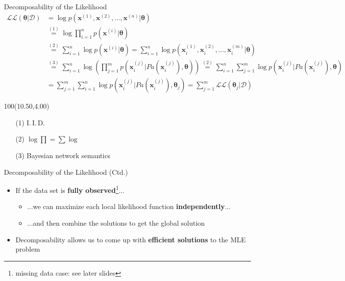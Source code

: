 \begin{frame}{Decomposability of the Likelihood}{}
	\vspace*{-3mm}
	\footnotesize
	\begin{align*}
		\mathcal{L}\mathcal{L}(\bm{\theta} \vert \mathcal{D})
			&= \log p(\bm{x}^{(1)}, \bm{x}^{(2)}, \dots, \bm{x}^{(n)} \vert \bm{\theta}) \\
			&\overset{(1)}{=} \log \prod_{i=1}^n p(\bm{x}^{(i)} \vert \bm{\theta}) \\
			&\overset{(2)}{=} \sum_{i=1}^n \log p(\bm{x}^{(i)} \vert \bm{\theta})
				= \sum_{i=1}^n \log p(\bm{x}_i^{(1)}, \bm{x}_i^{(2)}, \dots, \bm{x}_i^{(m)} \vert \bm{\theta}) \\
			&\overset{(3)}{=}
				\sum_{i=1}^n \log \left( \prod_{j=1}^m p(\bm{x}_i^{(j)} \vert Pa(\bm{x}_i^{(j)}), \bm{\theta}) \right)
				\overset{(2)}{=} \sum_{i=1}^n \sum_{j=1}^m \log p(\bm{x}_i^{(j)} \vert Pa(\bm{x}_i^{(j)}), \bm{\theta}) \\
			&= \sum_{j=1}^m \sum_{i=1}^n \log p(\bm{x}_i^{(j)} \vert Pa(\bm{x}_i^{(j)}), \bm{\theta}_j)
				= \sum_{j=1}^m \mathcal{L}\mathcal{L}(\bm{\theta}_j \vert \mathcal{D})
	\end{align*}

	\begin{textblock}{100}(10.50,4.00)
      		\footnotesize
		\begin{itemize}
			\item[(1)] I.\,I.\,D.
			\item[(2)] $\log \prod = \sum \log$
			\item[(3)] Bayesian network semantics 
		\end{itemize}
    	\end{textblock}
\end{frame}


\begin{frame}{Decomposability of the Likelihood (Ctd.)}{}
	\begin{itemize}
		\item If the data set is \textbf{fully observed}\footnote[frame]{missing data case: see later slides}...
		\begin{itemize}
			\item ...we can maximize each local likelihood function \textbf{independently}...
			\item ...and then combine the solutions to get the global solution
		\end{itemize}
		\item Decomposability allows us to come up with \textbf{efficient solutions} to the MLE problem
	\end{itemize}
	
	\begin{center}
		\large
	\end{center}
\end{frame}


